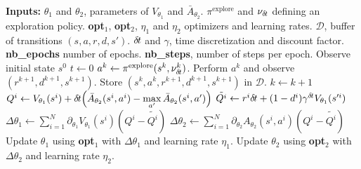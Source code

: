 \begin{algorithmic}
	\STATE \textbf{Inputs:}
	\STATE $\theta_1$ and $\theta_2$, parameters of
	$V_{\theta_1}$ and $\bar{A}_{\theta_2}$.
	\STATE $\pi^{\text{explore}}$ and $\nu_{\delta\hspace{-.1em}t}$ defining an exploration policy.
	\STATE \textbf{opt}$_1$, \textbf{opt}$_2$, $\eta_1$ and $\eta_2$ optimizers and learning rates.
	\STATE $\mathcal{D}$, buffer of transitions $(s, a, r, d, s')$.
	\STATE ${\delta\hspace{-.1em}t}$ and $\gamma$, time discretization and discount factor.
	\STATE \textbf{nb\_epochs} number of epochs.
	\STATE \textbf{nb\_steps}, number of steps per epoch.
	\STATE
	\STATE Observe initial state $s^0$
	\STATE $t \gets 0$
	\STATE $a^k \leftarrow \pi^{\text{explore}}(s^k, \nu^k_{\delta\hspace{-.1em}t})$.
	\STATE Perform $a^k$ and observe $(r^{k+1}, d^{k+1}, s^{k+1})$.
	\STATE Store $(s^k, a^k, r^{k+1}, d^{k+1}, s^{k+1})$ in $\mathcal{D}$.
	\STATE $k \gets k + 1$
	\ENDFOR
	\STATE {}
	\STATE $Q^i \gets V_{\theta_1}(s^i) + {\delta\hspace{-.1em}t}\hspace{-.17em}\left(
	\bar{A}_{\theta_2}(s^i, a^i) - \max\limits_{a'}\bar{A}_{\theta_2}(s^i, a')\right)$
	\STATE $\tilde{Q^i} \gets r^i{\delta\hspace{-.1em}t} + (1 - d^i) \gamma^{{\delta\hspace{-.1em}t}} V_{\theta_1}(s'^i)$
	\STATE $\Delta \theta_1 \gets \sum\limits_{i=1}^N \partial_{\theta_1} V_{\theta_1}(s^i) (Q^i - \tilde{Q^i})$
	\STATE $\Delta \theta_2 \gets \sum\limits_{i=1}^N \partial_{\theta_2} A_{\theta_2}(s^i, a^i) (Q^i - \tilde{Q^i})$
	\STATE Update $\theta_1$ using \textbf{opt}$_1$ with $\Delta \theta_1$ and learning rate $\eta_1$.
	\STATE Update $\theta_2$ using \textbf{opt}$_2$ with $\Delta \theta_2$ and learning rate $\eta_2$.
	\ENDFOR
	\ENDFOR
\end{algorithmic}
